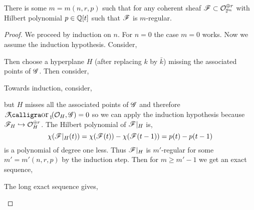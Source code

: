 \documentclass[12pt]{article}
\begin{document}
\begin{thm}
There is some $m = m(n, r, p)$ such that for any coherent sheaf $\mathscr{F} \subset \mathcal{O}_{\mathbb{P}^n}^{\oplus r}$ with Hilbert polynomial $p \in \mathbb{Q}[t]$ such that $\mathscr{F}$ is $m$-regular.
\end{thm}

\begin{proof}
We proceed by induction on $n$. For $n = 0$ the case $m = 0$ works. Now we assume the induction hypothesis. Consider,
\begin{center}
\end{center}
Then choose a hyperplane $H$ (after replacing $k$ by $\bar{k}$) missing the associated points of $\mathscr{G}$. Then consider,
\begin{center}
\end{center}
Towards induction, consider,
\begin{center}
\end{center}
but $H$ misses all the associated points of $\mathscr{G}$ and therefore $\shTor{}{1}{\struct{H}}{\G} = 0$ so we can apply the induction hypothesis because $\mathscr{F}_H \hookrightarrow \mathcal{O}_{H}^{\oplus r}$.
The Hilbert polynomial of $\mathscr{F}|_H$ is,
\[ \chi(\mathscr{F}|_H(t)) = \chi(\mathscr{F}(t)) - \chi(\mathscr{F}(t-1)) = p(t) - p(t-1) \]
is a polynomial of degree one less. Thus $\mathscr{F}|_H$ is $m'$-regular for some $m' = m'(n, r, p)$ by the induction step. Then for $m \ge m' - 1$ we get an exact sequence,
\begin{center}
\end{center}
The long exact sequence gives,
\begin{center}
\end{center}

\end{proof}
\end{document}

